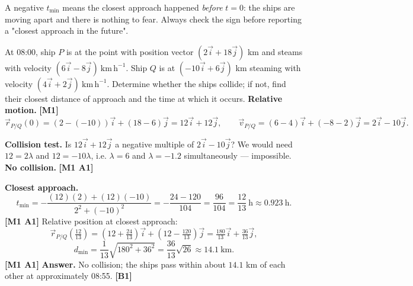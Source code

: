 \documentclass[11pt]{article}
\begin{document}
\begin{attention}
A negative $t_{\min}$ means the closest approach happened \emph{before} $t=0$: the ships are moving apart and there is nothing to fear. Always check the sign before reporting a "closest approach in the future".
\end{attention}

\begin{exoresolu}
At 08:00, ship $P$ is at the point with position vector $(2\vec{i}+18\vec{j})$ km and steams with velocity $(6\vec{i}-8\vec{j})\ \mathrm{km\,h^{-1}}$. Ship $Q$ is at $(-10\vec{i}+6\vec{j})$ km steaming with velocity $(4\vec{i}+2\vec{j})\ \mathrm{km\,h^{-1}}$. Determine whether the ships collide; if not, find their closest distance of approach and the time at which it occurs.
\tcblower
\textbf{Relative motion.} \hfill\textbf{[M1]}
\[ \vec{r}_{P/Q}(0)=(2-(-10))\vec{i}+(18-6)\vec{j}=12\vec{i}+12\vec{j},\qquad
\vec{v}_{P/Q}=(6-4)\vec{i}+(-8-2)\vec{j}=2\vec{i}-10\vec{j}. \]

\textbf{Collision test.} Is $12\vec{i}+12\vec{j}$ a negative multiple of $2\vec{i}-10\vec{j}$? We would need $12=2\lambda$ and $12=-10\lambda$, i.e. $\lambda=6$ and $\lambda=-1.2$ simultaneously — impossible. \textbf{No collision.} \hfill\textbf{[M1 A1]}

\textbf{Closest approach.}
\[ t_{\min}=-\frac{(12)(2)+(12)(-10)}{2^{2}+(-10)^{2}}=-\frac{24-120}{104}=\frac{96}{104}=\frac{12}{13}\ \mathrm{h}\approx 0.923\ \mathrm{h}. \]
\textbf{[M1 A1]}
Relative position at closest approach:
\[ \vec{r}_{P/Q}\!\left(\tfrac{12}{13}\right)=\left(12+\tfrac{24}{13}\right)\vec{i}+\left(12-\tfrac{120}{13}\right)\vec{j}=\tfrac{180}{13}\vec{i}+\tfrac{36}{13}\vec{j}, \]
\[ d_{\min}=\frac{1}{13}\sqrt{180^{2}+36^{2}}=\frac{36}{13}\sqrt{26}\approx 14.1\ \mathrm{km}. \]
\textbf{[M1 A1]}
\textbf{Answer.} No collision; the ships pass within about $14.1$ km of each other at approximately 08:55. \hfill\textbf{[B1]}
\end{exoresolu}
\end{document}
